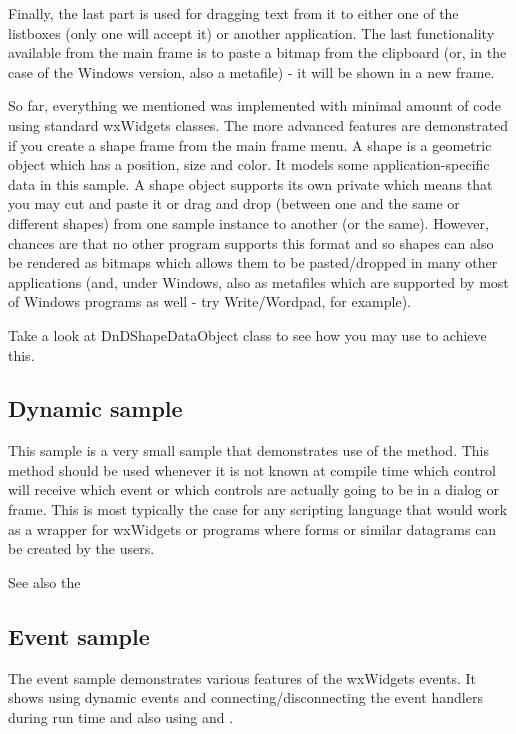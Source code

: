 Finally, the last part is used for dragging text from it to either one of the
listboxes (only one will accept it) or another application. The last
functionality available from the main frame is to paste a bitmap from the
clipboard (or, in the case of the Windows version, also a metafile) - it will be
shown in a new frame.

So far, everything we mentioned was implemented with minimal amount of code
using standard wxWidgets classes. The more advanced features are demonstrated
if you create a shape frame from the main frame menu. A shape is a geometric
object which has a position, size and color. It models some
application-specific data in this sample. A shape object supports its own
private  which means that you may cut and
paste it or drag and drop (between one and the same or different shapes) from
one sample instance to another (or the same). However, chances are that no
other program supports this format and so shapes can also be rendered as
bitmaps which allows them to be pasted/dropped in many other applications
(and, under Windows, also as metafiles which are supported by most of Windows
programs as well - try Write/Wordpad, for example).

Take a look at DnDShapeDataObject class to see how you may use
 to achieve this.


\subsection{Dynamic sample}\label{sampledynamic}

This sample is a very small sample that demonstrates use of the
 method. This method
should be used whenever it is not known at compile time which control
will receive which event or which controls are actually going to be in
a dialog or frame. This is most typically the case for any scripting
language that would work as a wrapper for wxWidgets or programs where
forms or similar datagrams can be created by the users.

See also the 


\subsection{Event sample}\label{sampleevent}

The event sample demonstrates various features of the wxWidgets events. It
shows using dynamic events and connecting/disconnecting the event handlers
during run time and also using
 and
.

